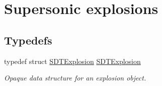 \hypertarget{group__explosions}{}\section{Supersonic explosions}
\label{group__explosions}
\subsection*{Typedefs}
\begin{DoxyCompactItemize}
\item 
\hypertarget{group__explosions_ga9be74dfac803ba58938fa89367285343}{}typedef struct \hyperlink{group__explosions_ga9be74dfac803ba58938fa89367285343}{S\+D\+T\+Explosion} \hyperlink{group__explosions_ga9be74dfac803ba58938fa89367285343}{S\+D\+T\+Explosion}\label{group__explosions_ga9be74dfac803ba58938fa89367285343}

\begin{DoxyCompactList}\small\item\em Opaque data structure for an explosion object. \end{DoxyCompactList}\end{DoxyCompactItemize}
